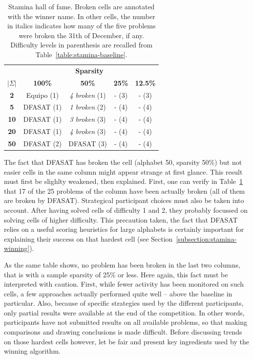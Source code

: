 \begin{table}
\begin{center}
\begin{tabular}{c|c c c c}
&\multicolumn{4}{|c}{\textbf{Sparsity}}\\ 
\textbf{$|\Sigma|$} & \textbf{100\%} & \textbf{50\%} & \textbf{25\%} & \textbf{12.5\%}\\
\hline
\textbf{2}  & Equipo (1) & \emph{4 broken} (1)  & - (3) & - (3) \\
\textbf{5}  & DFASAT (1) & \emph{1 broken} (2)  & - (4) & - (4) \\
\textbf{10} & DFASAT (1) & \emph{3 broken} (3)  & - (4) & - (4) \\
\textbf{20} & DFASAT (1) & \emph{4 broken} (3)  & - (4) & - (4) \\
\textbf{50} & DFASAT (2) & DFASAT (3) & - (4) & - (4) \\
\end{tabular}
\end{center}
\caption{Stamina hall of fame. Broken cells are annotated with the winner name. In other cells, the number in italics indicates how many of the five problems were broken the 31th of December, if any. Difficulty levels in parenthesis are recalled from Table~\ref{table:stamina-baseline}.\label{table:stamina-hall-of-fame}}
\end{table}

The fact that DFASAT has broken the cell (alphabet 50, sparsity 50\%) but not easier cells in the same column might appear strange at first glance. This result must first be slighlty weakened, then explained. First, one can verify in Table~\ref{table:stamina-hall-of-fame} that 17 of the 25 problems of the column have been actually broken (all of them are broken by DFASAT). Strategical participant choices must also be taken into account. After having solved cells of difficulty 1 and 2, they probably focussed on solving cells of higher difficulty. This precaution taken, the fact that DFASAT relies on a useful scoring heuristics for large alphabets is certainly important for explaining their success on that hardest cell (see Section~\ref{subsection:stamina-winning}).

As the same table shows, no problem has been broken in the last two columns, that is with a sample sparsity of 25\% or less. Here again, this fact must be interpreted with caution. First, while fewer activity has been monitored on such cells, a few approaches actually performed quite well -- above the baseline in particular. Also, because of specific strategies used by the different participants, only partial results were available at the end of the competition. In other words, participants have not submitted results on all available problems, so that making comparisons and drawing conclusions is made difficult. Before discussing trends on those hardest cells however, let be fair and present key ingredients used by the winning algorithm.

